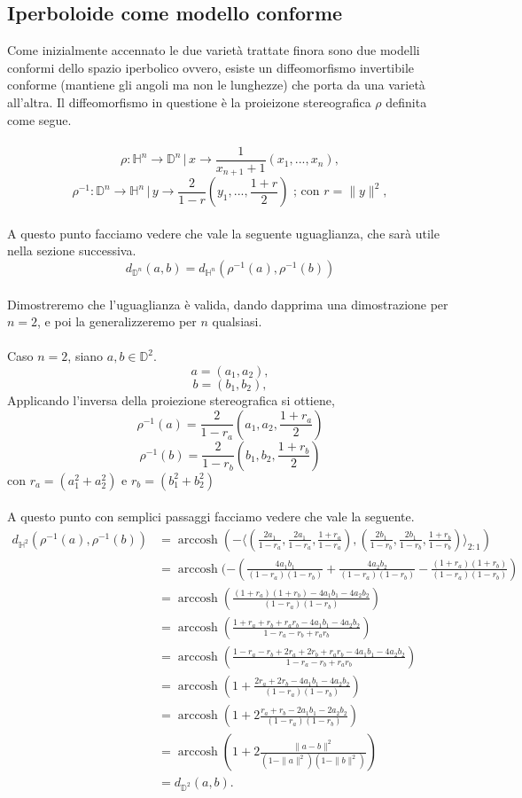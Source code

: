 \documentclass[a4paper, 12pt]{article}
\DeclareMathOperator\arccosh{arccosh}
\begin{document}
\subsection{Iperboloide come modello conforme} \label{centroide}
Come inizialmente accennato le due varietà trattate finora sono due modelli conformi dello spazio iperbolico ovvero, esiste un diffeomorfismo invertibile conforme (mantiene gli angoli ma non le lunghezze) che porta da una varietà all'altra. Il diffeomorfismo in questione è la proieizone stereografica $\rho$ definita come segue.\\\\
\[\rho : \mathbb{H}^n \to \mathbb{D}^n \, | \, x \to \frac{1}{x_{n+1} + 1}(x_1, ..., x_n),\]
\[\rho^{-1} : \mathbb{D}^n \to \mathbb{H}^n \, | \, y \to \frac{2}{1 - r}(y_1, ..., \frac{1+r}{2}) \mbox{ ; con } r = \| y \|^2, \]\\
A questo punto facciamo vedere che vale la seguente uguaglianza, che sarà utile nella sezione successiva.\\
\[d_{\mathbb{D}^n}(a, b) = d_{\mathbb{H}^n}(\rho^{-1}(a), \rho^{-1}(b))\]\\
Dimostreremo che l'uguaglianza è valida, dando dapprima una dimostrazione per $n = 2$, e poi la generalizzeremo per $n$ qualsiasi.\\\\
Caso $n=2$, siano $a, b \in \mathbb{D}^2$.\\
\[a = (a_1, a_2),\]
\[b = (b_1, b_2),\]
Applicando l'inversa della proiezione stereografica si ottiene,
\[\rho^{-1}(a) = \frac{2}{1-r_a}(a_1, a_2, \frac{1 + r_a}{2})\]
\[\rho^{-1}(b) = \frac{2}{1-r_b}(b_1, b_2, \frac{1 + r_b}{2})\]
con $r_a = (a_1^2 + a_2^2)$ e $r_b = (b_1^2 + b_2^2)$\\\\
A questo punto con semplici passaggi facciamo vedere che vale la seguente.
\begin{equation*}\begin{split}
d_{\mathbb{H}^2}(\rho^{-1}(a), \rho^{-1}(b)) &= \arccosh(-\langle (\frac{2a_1}{1-r_a}, \frac{2a_1}{1-r_a}, \frac{1+r_a}{1-r_a}), (\frac{2b_1}{1-r_b}, \frac{2b_1}{1-r_b}, \frac{1+r_b}{1-r_b}) \rangle_{2:1})\\
&=\arccosh(- (\frac{4a_1b_1}{(1-r_a)(1-r_b)} + \frac{4a_2b_2}{(1-r_a)(1-r_b)} - \frac{(1+r_a)(1+r_b)}{(1-r_a)(1-r_b)})\\
&=\arccosh(\frac{(1+r_a)(1+r_b) - 4a_1b_1 - 4a_2b_2}{(1-r_a)(1-r_b)})\\
&=\arccosh(\frac{1 + r_a +r_b + r_ar_b - 4a_1b_1 - 4a_2b_2}{1 - r_a - r_b + r_ar_b})\\
&=\arccosh(\frac{1 -r_a -r_b + 2r_a + 2r_b + r_ar_b - 4a_1b_1 - 4a_2b_2}{1 - r_a - r_b + r_ar_b})\\
&=\arccosh(1 + \frac{2r_a + 2r_b - 4a_1b_1 - 4a_2b_2}{(1-r_a)(1-r_b)})\\
&=\arccosh(1 + 2 \frac{r_a + r_b - 2a_1b_1 - 2a_2b_2}{(1-r_a)(1-r_b)})\\
&=\arccosh(1 + 2\frac{\| a - b \|^2}{(1 - \| a \|^2)(1 - \| b \|^2)})\\
&=d_{\mathbb{D}^2}(a, b).
\end{split}\end{equation*}
\end{document}
